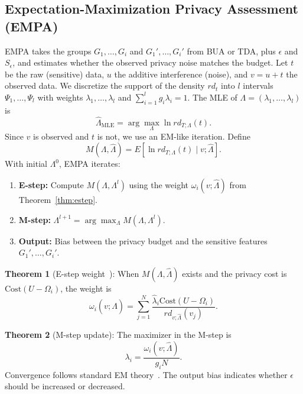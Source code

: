 \documentclass[journal]{IEEEtran}
\begin{document}
\subsection{Expectation-Maximization Privacy Assessment (EMPA)}
\label{subsec:empa}

EMPA takes the groups $G_1,\ldots,G_i$ and $G_1',\ldots,G_i'$ from BUA or TDA, plus $\epsilon$ and $S_\epsilon$, and estimates whether the observed privacy noise matches the budget. Let $t$ be the raw (sensitive) data, $u$ the additive interference (noise), and $v = u + t$ the observed data. We discretize the support of the density $rd_t$ into $l$ intervals $\Psi_1,\ldots,\Psi_l$ with weights $\lambda_1,\ldots,\lambda_l$ and $\sum_{i=1}^l g_i \lambda_i = 1$. The MLE of $\Lambda = (\lambda_1,\ldots,\lambda_l)$ is
\begin{equation}
\hat{\Lambda}_{\mathrm{MLE}} = \arg\max_\Lambda \ln rd_{T;\Lambda}(t).
\end{equation}
Since $v$ is observed and $t$ is not, we use an EM-like iteration. Define
\begin{equation}
M(\Lambda,\hat{\Lambda}) = E\left[ \ln rd_{T;\Lambda}(t) \mid v; \hat{\Lambda} \right].
\end{equation}
With initial $\Lambda^0$, EMPA iterates:
\begin{enumerate}
\item \textbf{E-step:} Compute $M(\Lambda,\Lambda^l)$ using the weight $\omega_i(v;\hat{\Lambda})$ from Theorem~\ref{thm:estep}.
\item \textbf{M-step:} $\Lambda^{l+1} = \arg\max_\Lambda M(\Lambda,\Lambda^l)$.
\item \textbf{Output:} Bias between the privacy budget and the sensitive features $G_1',\ldots,G_i'$.
\end{enumerate}

\textbf{Theorem 1} (E-step weight~\cite{dempster-laird-rubin-77}): When $M(\Lambda,\hat{\Lambda})$ exists and the privacy cost is $\mathrm{Cost}(U - \Omega_i)$, the weight is
\begin{equation}
\omega_i(v;\hat{\Lambda}) = \sum_{j=1}^N \frac{\hat{\lambda}_i \mathrm{Cost}(U - \Omega_i)}{rd_{v;\hat{\Lambda}}(v_j)}.
\end{equation}
\label{thm:estep}

\textbf{Theorem 2} (M-step update): The maximizer in the M-step is
\begin{equation}
\lambda_i = \frac{\omega_i(v;\hat{\Lambda})}{g_i N}.
\end{equation}
Convergence follows standard EM theory~\cite{em-converge}. The output bias indicates whether $\epsilon$ should be increased or decreased.
\end{document}
